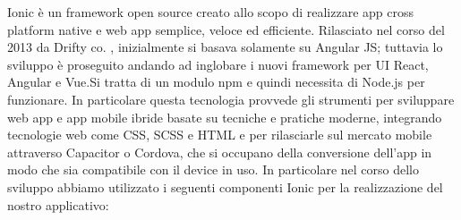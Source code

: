 Ionic è un framework open source creato allo scopo di realizzare app cross platform native e web app semplice, veloce ed efficiente. Rilasciato nel corso del 2013 da Drifty co. , inizialmente si basava solamente su Angular JS; tuttavia lo sviluppo è proseguito andando ad inglobare i nuovi framework per UI React, Angular e Vue.Si tratta di un modulo npm e quindi necessita di Node.js per funzionare.
In particolare questa tecnologia provvede gli strumenti per sviluppare web app e app mobile ibride basate su tecniche e pratiche moderne, integrando tecnologie web come CSS, SCSS  e HTML e per rilasciarle sul mercato mobile attraverso Capacitor o Cordova, che si occupano della conversione dell'app in modo che sia compatibile con il device in uso.
In particolare nel corso dello sviluppo abbiamo utilizzato i seguenti componenti Ionic per la realizzazione del nostro applicativo:
